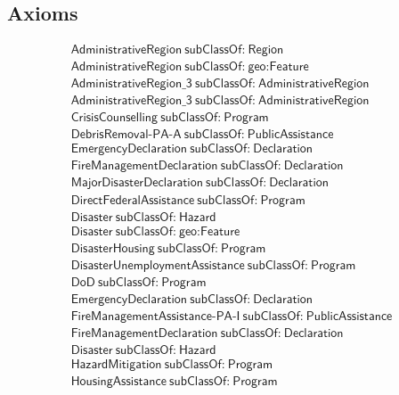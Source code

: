 \subsection{Axioms}
\begin{align}
  \textsf{AdministrativeRegion}~\textsf{subClassOf:}~\textsf{Region}\\
  \textsf{AdministrativeRegion}~\textsf{subClassOf:}~\textsf{geo:Feature}\\
  \textsf{AdministrativeRegion\_3}~\textsf{subClassOf:}~\textsf{AdministrativeRegion}\\
  \textsf{AdministrativeRegion\_3}~\textsf{subClassOf:}~\textsf{AdministrativeRegion}\\
  \textsf{CrisisCounselling}~\textsf{subClassOf:}~\textsf{Program}\\
  \textsf{DebrisRemoval-PA-A}~\textsf{subClassOf:}~\textsf{PublicAssistance}\\
  \textsf{EmergencyDeclaration}~\textsf{subClassOf:}~\textsf{Declaration}\\
  \textsf{FireManagementDeclaration}~\textsf{subClassOf:}~\textsf{Declaration}\\
  \textsf{MajorDisasterDeclaration}~\textsf{subClassOf:}~\textsf{Declaration}\\
  \textsf{DirectFederalAssistance}~\textsf{subClassOf:}~\textsf{Program}\\
  \textsf{Disaster}~\textsf{subClassOf:}~\textsf{Hazard}\\
  \textsf{Disaster}~\textsf{subClassOf:}~\textsf{geo:Feature}\\
  \textsf{DisasterHousing}~\textsf{subClassOf:}~\textsf{Program}\\
  \textsf{DisasterUnemploymentAssistance}~\textsf{subClassOf:}~\textsf{Program}\\
  \textsf{DoD}~\textsf{subClassOf:}~\textsf{Program}\\
  \textsf{EmergencyDeclaration}~\textsf{subClassOf:}~\textsf{Declaration}\\
  \textsf{FireManagementAssistance-PA-I}~\textsf{subClassOf:}~\textsf{PublicAssistance}\\
  \textsf{FireManagementDeclaration}~\textsf{subClassOf:}~\textsf{Declaration}\\
  \textsf{Disaster}~\textsf{subClassOf:}~\textsf{Hazard}\\
  \textsf{HazardMitigation}~\textsf{subClassOf:}~\textsf{Program}\\
  \textsf{HousingAssistance}~\textsf{subClassOf:}~\textsf{Program}\\

\end{align}
